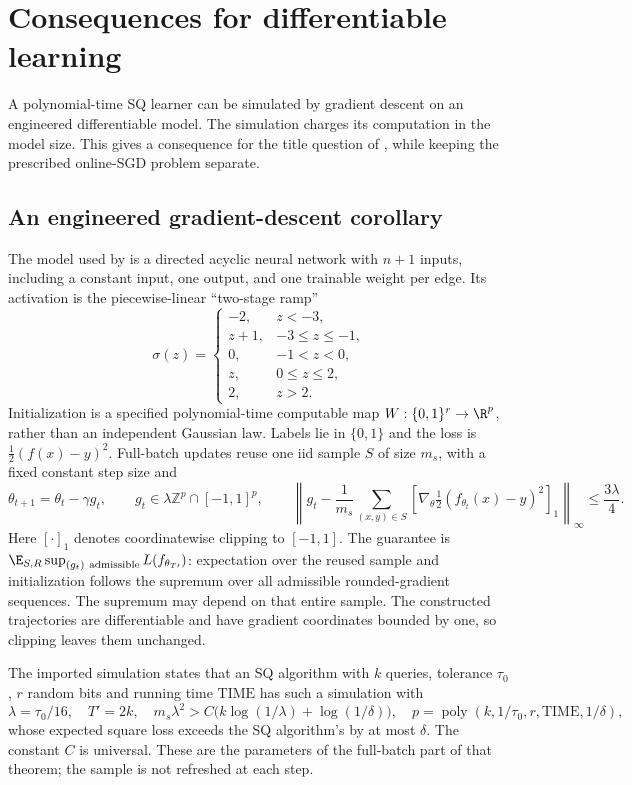 \section{Consequences for differentiable learning}\label{sec:resources}
A polynomial-time SQ learner can be simulated by gradient descent on an engineered differentiable model. The simulation charges its computation in the model size. This gives a consequence for the title question of \citet{FKS26}, while keeping the prescribed online-SGD problem separate.

\subsection{An engineered gradient-descent corollary}
The model used by \citet[Theorem~3d]{AKMSS21} is a directed acyclic neural network with $n+1$ inputs, including a constant input, one output, and one trainable weight per edge. Its activation is the piecewise-linear ``two-stage ramp''
\[
 \sigma(z)=\begin{cases}
 -2,&z<-3,\\ z+1,&-3\le z\le-1,\\0,&-1<z<0,\\z,&0\le z\le2,\\2,&z>2.
 \end{cases}
\]
Initialization is a specified polynomial-time computable map $W:\{0,1\}^r\to\R^p$, rather than an independent Gaussian law. Labels lie in $\{0,1\}$ and the loss is $\tfrac12(f(x)-y)^2$. Full-batch updates reuse one iid sample $S$ of size $m_s$, with a fixed constant step size and
\begin{equation}\label{eq:engineered-gradient}
 \theta_{t+1}=\theta_t-\gamma g_t,\qquad
 g_t\in\lambda\mathbb Z^p\cap[-1,1]^p,\qquad
 \left\|g_t-\frac1{m_s}\sum_{(x,y)\in S}
       [\nabla_\theta\tfrac12(f_{\theta_t}(x)-y)^2]_1\right\|_\infty
 \le\frac{3\lambda}{4}.
\end{equation}
Here $[\cdot]_1$ denotes coordinatewise clipping to $[-1,1]$. The guarantee is $\E_{S,R}\sup_{(g_t)\ \mathrm{admissible}}L(f_{\theta_{T\prime}})$: expectation over the reused sample and initialization follows the supremum over all admissible rounded-gradient sequences. The supremum may depend on that entire sample. The constructed trajectories are differentiable and have gradient coordinates bounded by one, so clipping leaves them unchanged.

The imported simulation states that an SQ algorithm with $k$ queries, tolerance $\tau_0$, $r$ random bits and running time $\mathrm{TIME}$ has such a simulation with
\begin{equation}\label{eq:engineered-parameters}
 \lambda=\tau_0/16,\quad T'=2k,\quad
 m_s\lambda^2>C\bigl(k\log(1/\lambda)+\log(1/\delta)\bigr),\quad
 p=\operatorname{poly}(k,1/\tau_0,r,\mathrm{TIME},1/\delta),
\end{equation}
whose expected square loss exceeds the SQ algorithm's by at most $\delta$. The constant $C$ is universal. These are the parameters of the full-batch part of that theorem; the sample is not refreshed at each step.

